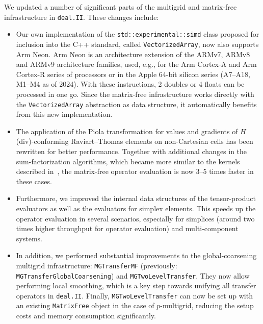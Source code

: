 \documentclass{ansarticle-preprint}
\newcommand{\specialword}[1]{\texttt{#1}}
\newcommand{\dealii}{{\specialword{deal.II}}\xspace}
\begin{document}
We updated a number of significant parts of the multigrid and matrix-free
infrastructure in \dealii. These changes include:
\begin{itemize}
\item Our own implementation of the \texttt{std::experimental::simd}
  class proposed for inclusion into the C++ standard, called
  \texttt{VectorizedArray}, now also supports Arm Neon. Arm Neon is an
  architecture extension of the ARMv7, ARMv8 and ARMv9 architecture families,
  used, e.g., for the Arm Cortex-A and Arm Cortex-R series of processors or in
  the Apple 64-bit silicon series (A7--A18, M1--M4 as of 2024).
  With these instructions, 2 doubles or 4 floats can be processed in one
  go. Since the matrix-free infrastructure works directly with the \texttt{VectorizedArray}
  abstraction as data structure, it automatically benefits from this new implementation.

\item The application of the Piola transformation for values and gradients of
  $H$(div)-conforming Raviart--Thomas elements on non-Cartesian cells has
  been rewritten for better performance. Together with additional changes in
  the sum-factorization algorithms, which became more similar to the kernels
  described in~\cite{KronbichlerKormann2019}, the matrix-free operator
  evaluation is now 3--5 times faster in these cases.

\item Furthermore, we improved the internal data structures of the tensor-product
  evaluators as well as the evaluators for simplex elements.  This speeds up
  the operator evaluation in several scenarios, especially for simplices
  (around two times higher throughput for operator evaluation) and
  multi-component systems.

\item In addition, we performed substantial improvements to the global-coarsening
  multigrid infrastructure: \texttt{MGTransferMF} (previously:
  \texttt{MGTransferGlobalCoarsening}) and \texttt{MGTwoLevel\-Transfer}. They
  now allow performing local smoothing, which is a key step towards unifying
  all transfer operators in \dealii. Finally, \texttt{MGTwoLevelTransfer} can now
  be set up with an existing \texttt{MatrixFree} object in the case
  of $p$-multigrid, reducing the setup costs and memory consumption significantly.
\end{itemize}


\end{document}

